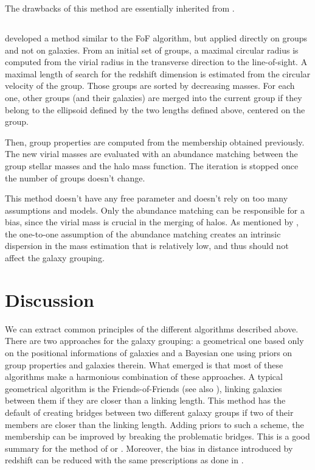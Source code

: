 The drawbacks of this method are essentially inherited from \citet{Yang+07}.

\subsection{\citet{MunozCuartas+12}}
\label{sub:munozcuartas12}

\cite{MunozCuartas+12} developed a method similar to the FoF algorithm, but
applied directly on groups and not on galaxies. From an initial set of groups,
a maximal circular radius is computed from the virial radius in the transverse
direction to the line-of-sight. A maximal length of search for the redshift
dimension is estimated from the circular velocity of the group. Those groups
are sorted by decreasing masses. For each one, other groups (and their
galaxies) are merged into the current group if they belong to the ellipsoid
defined by the two lengths defined above, centered on the group.

Then, group properties are computed from the membership obtained previously.
The new virial masses are evaluated with an abundance matching between the
group stellar masses and the halo mass function. The iteration is stopped once
the number of groups doesn't change.

This method doesn't have any free parameter and doesn't rely on too many
assumptions and models. Only the abundance matching can be responsible for a
bias, since the virial mass is crucial in the merging of halos. As mentioned by
\citet{Yang+07}, the one-to-one assumption of the abundance matching creates an
intrinsic dispersion in the mass estimation that is relatively low, and thus
should not affect the galaxy grouping.

\section{Discussion}
\label{sec:gga_discussion}

We can extract common principles of the different algorithms described above.
There are two approaches for the galaxy grouping: a geometrical one based only
on the positional informations of galaxies and a Bayesian one using priors on
group properties and galaxies therein. What emerged is that most of these
algorithms make a harmonious combination of these approaches. A typical
geometrical algorithm is the Friends-of-Friends (see also
), linking galaxies between them
if they are closer than a linking length. This method has the default of
creating bridges between two different galaxy groups if two of their members
are closer than the linking length. Adding priors to such a scheme, the
membership can be improved by breaking the problematic bridges. This is a good
summary for the method of \citet{Marinoni+02} or \citet{MunozCuartas+12}.
Moreover, the bias in distance introduced by redshift can be reduced with the
same prescriptions as done in \citet{Liu+08}.

